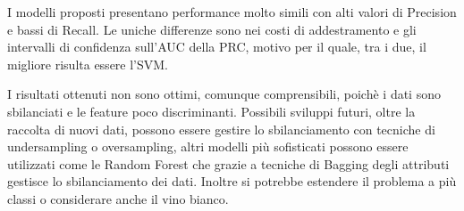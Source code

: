 \noindent
I modelli proposti presentano performance molto simili con alti valori di Precision e bassi di Recall. Le uniche differenze sono nei costi di addestramento e gli intervalli di confidenza sull'AUC della PRC, motivo per il quale, tra i due, il migliore risulta essere l'SVM.

\noindent
I risultati ottenuti non sono ottimi, comunque comprensibili, poichè i dati sono sbilanciati e le feature poco discriminanti.
Possibili sviluppi futuri, oltre la raccolta di nuovi dati, possono essere gestire lo sbilanciamento con tecniche di undersampling o oversampling, altri modelli più sofisticati possono essere utilizzati come le Random Forest che grazie a tecniche di Bagging degli attributi gestisce lo sbilanciamento dei dati.
Inoltre si potrebbe estendere il problema a più classi o considerare anche il vino bianco.

